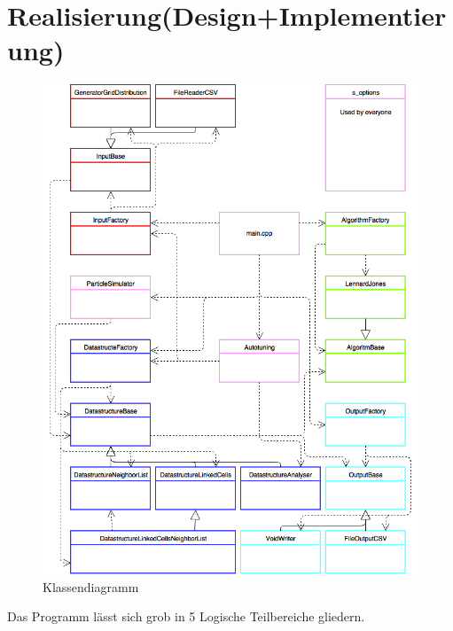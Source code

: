\documentclass[
	12pt,
	a4paper,
	BCOR10mm,
	DIV14,
	headsepline,
]{scrreprt}
\begin{document}
\chapter{Realisierung(Design+Implementierung)}
\label{Realisierung(Design+Implementierung)}
	\begin{figure}[h]
		\centering
		\includegraphics[height=0.6\textheight]{ClassDiagram.png}
		\caption{Klassendiagramm}
		\label{figure:Klassendiagramm}
	\end{figure}
	Das Programm lässt sich grob in 5 Logische Teilbereiche gliedern.
\end{document}
